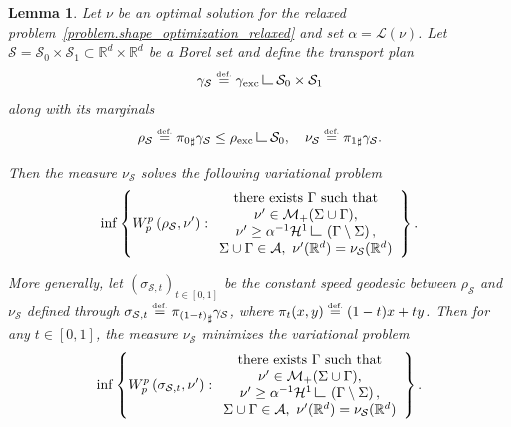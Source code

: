 \documentclass[JEP,XML,SOM,Unicode,NoFloatCountersInSection,published]{cedram}
\newtheorem{lemma}[theorem]{Lemma}
\theoremstyle{definition}
\newcommand{\eqdef}{\ensuremath{\stackrel{\mbox{\upshape\tiny def.}}{=}}}
\newcommand\LM[1]{\hbox{\vrule width.5pt \vbox to#1pt{\vfill \hrule width#1pt height.5pt}}}
\newcommand\LL{{\mathchoice {\>\LM7\>}{\>\LM7\>}{\,\LM5\,}{\,\LM{3.35}\,}}}
\newcommand{\mres}{\LL}
\newcommand{\RR}{\mathbb{R}}
\newcommand{\rhoexc}{\rho_{\textup{exc}}}
\newcommand{\gammaexc}{\gamma_{\textup{exc}}}
\begin{document}
\begin{lemma}\label{lemma.auxiliary_problem}
Let $\nu$ be an optimal solution for the relaxed problem~\eqref{problem.shape_optimization_relaxed} and set $\alpha = \mathcal{L}(\nu)$. Let $\mathcal{S} = \mathcal{S}_0\times \mathcal{S}_1 \subset \RR^d\times \RR^d$ be a Borel set and define the transport plan
\[
\gamma_{\mathcal{S}} \eqdef \gammaexc \mres \mathcal{S}_0\times \mathcal{S}_1
\]
along with its marginals
\[
\rho_{\mathcal{S}} \eqdef {\pi_{0}}_\sharp\gamma_\mathcal{S}
\le \rhoexc \mres \mathcal{S}_0,
\quad \nu_{\mathcal{S}} \eqdef {\pi_{1}}_\sharp\gamma_{\mathcal{S}}.
\]

Then the measure $\nu_{\mathcal{S}}$ solves the following variational problem
\begin{equation}
\inf
\left\{
W_p^p\left(
\rho_{\mathcal{S}}, \nu'
\right) :
\begin{array}{c}
\text{there exists $\Gamma$ such that}\\
\nu' \in \mathcal{M}_+(\Sigma \cup \Gamma),\\
\nu' \ge \alpha^{-1}\mathcal{H}^1\mres \left(\Gamma\setminus \Sigma\right), \\
\Sigma \cup \Gamma \in \mathcal{A}, \
\nu'(\RR^d) = \nu_{\mathcal{S}}(\RR^d)
\end{array}
\right\}.
\end{equation}

More generally, let $\left(\sigma_{\mathcal{S},t}\right)_{t \in [0,1]}$ be the constant speed geodesic between $\rho_{\mathcal{S}}$ and $\nu_{\mathcal{S}}$ defined through $\sigma_{\mathcal{S},t} \eqdef {\pi_{(1-t)}}_\sharp\gamma_{\mathcal{S}}$, where $\pi_t(x,y) \eqdef (1-t)x + ty$. Then for any $t \in [0,1]$, the measure $\nu_{\mathcal{S}}$ minimizes the variational problem
\begin{equation}\label{auxiliary_problem_sigma}
\inf
\left\{
W_p^p\left(
\sigma_{\mathcal{S}, t}, \nu'
\right) :
\begin{array}{c}
\text{there exists $\Gamma$ such that}\\
\nu' \in \mathcal{M}_+(\Sigma \cup \Gamma),\\
\nu' \ge \alpha^{-1}\mathcal{H}^1\mres \left(\Gamma\setminus \Sigma\right), \\
\Sigma \cup \Gamma \in \mathcal{A}, \
\nu'(\RR^d) = \nu_{\mathcal{S}}(\RR^d)
\end{array}
\right\}.
\end{equation}
\end{lemma}
\end{document}
